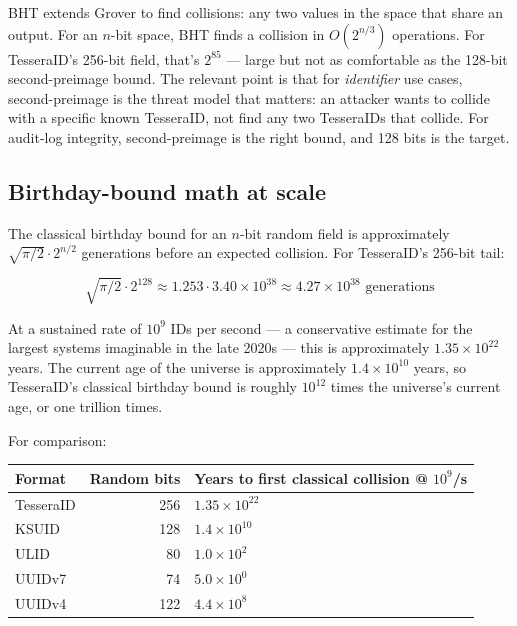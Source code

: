 BHT extends Grover to find collisions: any two values in the space that share an output. For an $n$-bit space, BHT finds a collision in $O(2^{n/3})$ operations. For TesseraID's 256-bit field, that's $2^{85}$ --- large but not as comfortable as the 128-bit second-preimage bound. The relevant point is that for \emph{identifier} use cases, second-preimage is the threat model that matters: an attacker wants to collide with a specific known TesseraID, not find any two TesseraIDs that collide. For audit-log integrity, second-preimage is the right bound, and 128 bits is the target.

\subsection{Birthday-bound math at scale}

The classical birthday bound for an $n$-bit random field is approximately $\sqrt{\pi/2} \cdot 2^{n/2}$ generations before an expected collision. For TesseraID's 256-bit tail:

\begin{equation}
\sqrt{\pi/2} \cdot 2^{128} \approx 1.253 \cdot 3.40 \times 10^{38} \approx 4.27 \times 10^{38} \text{ generations}
\end{equation}

At a sustained rate of $10^9$ IDs per second --- a conservative estimate for the largest systems imaginable in the late 2020s --- this is approximately $1.35 \times 10^{22}$ years. The current age of the universe is approximately $1.4 \times 10^{10}$ years, so TesseraID's classical birthday bound is roughly $10^{12}$ times the universe's current age, or one trillion times.

For comparison:

\begin{center}
\renewcommand{\arraystretch}{1.15}
\begin{tabular}{lrl}
\toprule
\textbf{Format} & \textbf{Random bits} & \textbf{Years to first classical collision @ $10^9$/s} \\
\midrule
TesseraID    & 256 & $1.35 \times 10^{22}$ \\
KSUID   & 128 & $1.4 \times 10^{10}$  \\
ULID    &  80 & $1.0 \times 10^{2}$  \\
UUIDv7  &  74 & $5.0 \times 10^{0}$  \\
UUIDv4  & 122 & $4.4 \times 10^{8}$  \\
\bottomrule
\end{tabular}
\end{center}

